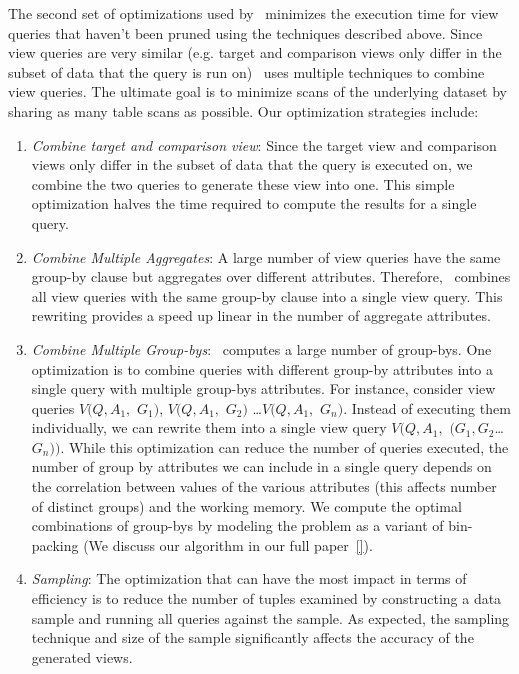 The second set of optimizations used by \SeeDB\ minimizes the execution time for
view queries that haven't been pruned using the techniques described above.
Since view queries are very similar (e.g. target and comparison views only differ in the subset of data that the
query is run on) \SeeDB\ uses multiple techniques to combine view queries. 
The ultimate goal is to minimize scans of the underlying dataset by sharing as
many table scans as possible. Our optimization strategies include:

\begin{enumerate}
  \item {\it Combine target and comparison view}: Since the target view and
  comparison views only differ in the subset of data that the query is
  executed on, we combine the two queries to generate these view into one.
  This simple optimization halves the time required to compute the results for
  a single query.
  \item {\it Combine Multiple Aggregates}: A large number of view
  queries have the same group-by clause but aggregates over different attributes.
  Therefore, \SeeDB\ combines all view queries with the same group-by clause
  into a single view query. This rewriting provides a speed up linear in the
  number of aggregate attributes.
  \item {\it Combine Multiple Group-bys}: 
  \SeeDB\ computes a large number of group-bys. One optimization is to
  combine queries with different group-by attributes into a single query with
  multiple group-bys attributes. For instance, consider view queries $V(Q,
  A_1,$ $G_1)$, $V(Q, A_1,$ $G_2)$ \ldots $V(Q, A_1,$ $G_n)$. Instead of
  executing them individually, we can rewrite them into a single view query
  $V(Q, A_1,$ $(G_1, G_2$\ldots $G_n))$. While this optimization can reduce the
  number of queries executed, the number of group by attributes we can include in a single query
  depends on the correlation between values of the various attributes (this
  affects number of distinct groups) and the working memory. We compute the
  optimal combinations of group-bys by modeling the problem as a variant of
  bin-packing (We discuss our algorithm in our full paper~\ref{}). 
  \item {\it Sampling}: The optimization that can have the most impact in
  terms of efficiency is to reduce the number of tuples examined by
  constructing a data sample and running all queries against the sample. As
  expected, the sampling technique and size of the sample significantly affects
  the accuracy of the generated views. 
\end{enumerate}



